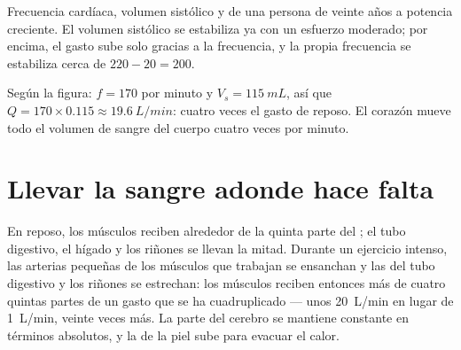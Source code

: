 \begin{omfigure}

{\small Frecuencia cardíaca, volumen sistólico y  de una
persona de veinte años a potencia creciente. El volumen sistólico se
estabiliza ya con un esfuerzo moderado; por encima, el gasto sube solo
gracias a la frecuencia, y la propia frecuencia se estabiliza cerca de
$220 - 20 = 200$.}
\end{omfigure}

\begin{example}\label{ex:g10:heart-lungs-effort:output200}
Según la figura: $f = 170$ por minuto y $V_s = \qty{115}{mL}$, así que
$Q = 170 \times 0.115 \approx \qty{19.6}{L/min}$: cuatro veces el gasto
de reposo. El corazón mueve todo el volumen de sangre del cuerpo cuatro
veces por minuto.
\end{example}

\section{Llevar la sangre adonde hace falta}

\begin{proposition}\label{prop:g10:heart-lungs-effort:redistribution}
En reposo, los músculos reciben alrededor de la quinta parte del ; el tubo digestivo, el hígado y los riñones se llevan la
mitad. Durante un ejercicio intenso, las arterias pequeñas de los
músculos que trabajan se ensanchan y las del tubo digestivo y los
riñones se estrechan: los músculos reciben entonces más de cuatro
quintas partes de un gasto que se ha cuadruplicado --- unos
\qty{20}{L/min} en lugar de \qty{1}{L/min}, veinte veces más. La parte
del cerebro se mantiene constante en términos absolutos, y la de la
piel sube para evacuar el calor.
\end{proposition}
\admitted

